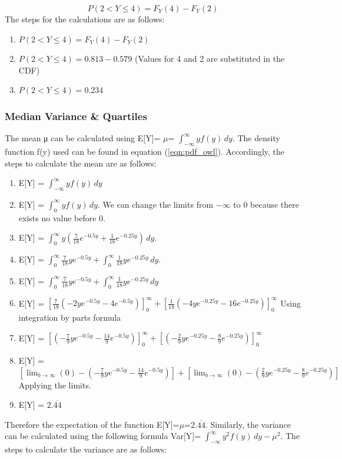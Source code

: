 \begin{equation}
 P(2< Y \le 4) = F_{Y}(4) - F_{Y}(2)   
\end{equation}
The steps for the calculations are as follows:
\begin{enumerate}
    \item $ P(2< Y \le 4) = F_{Y}(4) - F_{Y}(2)$
    \item $ P(2< Y \le 4) = 0.813 - 0.579$ (Values for 4 and 2 are substituted in the CDF)
    \item $ P(2< Y \le 4) = 0.234$
\end{enumerate}
    
\subsubsection{Median Variance \& Quartiles}    

The mean μ can be calculated using E[Y]= $\mu$= $\int_{-\infty}^{\infty} yf(y)\,dy$. The density function f(y) used can be found in equation (\ref{eqn:pdf_owl}). Accordingly, the steps to calculate the mean are as follows: 

\begin{enumerate}
    \item E[Y] = $\int_{-\infty}^{\infty} yf(y)\,dy$
    \item E[Y] = $\int_{0}^{\infty} yf(y)\,dy$.  We can change the limits from $-\infty$ to 0 because there exists no value before 0.
    \item E[Y] = $\int_{0}^{\infty} y(\frac{7}{18}e^{-0.5y} + \frac{1}{18}e^{-0.25y})\,dy$.
    \item E[Y] = $\int_{0}^{\infty} \frac{7}{18}ye^{-0.5y} + \int_{0}^{\infty} \frac{1}{18}ye^{-0.25y}\,dy$.
    \item E[Y] = $\int_{0}^{\infty} \frac{7}{18}ye^{-0.5y} + \int_{0}^{\infty} \frac{1}{18}ye^{-0.25y}\,dy$ \label{eqn:mean_line_5}
    \item E[Y] = $[\frac{7}{18}(-2ye^{-0.5y}-4e^{-0.5y})]_0^\infty + [\frac{1}{18}(-4ye^{-0.25y}-16e^{-0.25y})]_0^\infty$ Using integration by parts formula
    \item E[Y] = $[(-\frac{7}{9}ye^{-0.5y}-\frac{14}{9}e^{-0.5y})]_0^\infty + [(-\frac{2}{9}ye^{-0.25y}-\frac{8}{9}e^{-0.25y})]_0^\infty$
    \item E[Y] = $[\lim_{b\to\infty}(0)-(-\frac{7}{9}ye^{-0.5y}-\frac{14}{9}e^{-0.5y})] + [\lim_{b\to\infty}(0)-(\frac{2}{9}ye^{-0.25y}-\frac{8}{9}e^{-0.25y})]$ Applying the limits.
    \item E[Y] = $2.\overline{44}$
\end{enumerate}
Therefore the expectation of the function E[Y]=$\mu$=$2.\overline{44}$. Similarly, the variance can be calculated using the following formula Var[Y]= $\int_{-\infty}^{\infty}y^2f(y)\,dy - \mu^2$. The steps to calculate the variance are as follows: 


